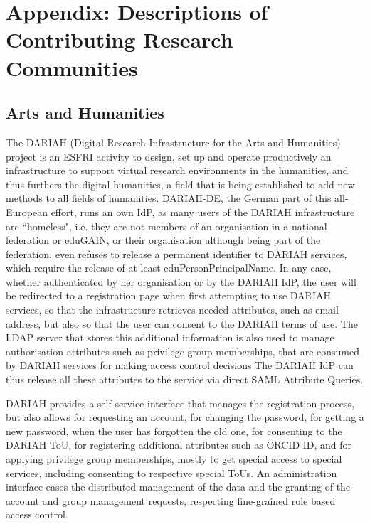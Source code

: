 \documentclass[fleqn,10pt]{wlscirep}
\begin{document}
{\appendix
\newpage



\newpage
\section{Appendix: Descriptions of Contributing Research Communities}

\subsection{Arts and Humanities}
The DARIAH (Digital Research Infrastructure for the Arts and Humanities)\cite{dariah} project is an ESFRI activity to design, set up and operate productively an infrastructure to support virtual research environments in the humanities, and thus furthers the digital humanities, a field that is being established to add new methods to all fields of humanities. DARIAH-DE, the German part of this all-European effort, runs an own IdP, as many users of the DARIAH infrastructure are ``homeless", i.e. they are not members of an organisation in a national federation or eduGAIN, or their organisation although being part of the federation, even refuses to release a permanent identifier to DARIAH services, which require the release of at least eduPersonPrincipalName. In any case, whether authenticated by her organisation or by the DARIAH IdP, the user will be redirected to a registration page when first attempting to use DARIAH services, so that the infrastructure retrieves needed attributes, such as email address, but also so that the user can consent to the DARIAH terms of use. The LDAP server that stores this additional information is also used to manage authorisation attributes such as privilege group memberships, that are consumed by DARIAH services for making access control decisions The DARIAH IdP can thus release all these attributes to the service via direct SAML Attribute Queries.

DARIAH provides a self-service interface that manages the registration process, but also allows for requesting an account, for changing the password, for getting a new password, when the user has forgotten the old one, for consenting to the DARIAH ToU, for registering additional attributes such as ORCID ID, and for applying privilege group memberships, mostly to get special access to special services, including consenting to respective special ToUs. An administration interface eases the distributed management of the data and the granting of the account and group management requests, respecting fine-grained role based access control.

}
\end{document}

